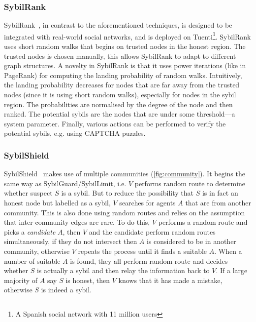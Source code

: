 
\subsubsection{SybilRank}
SybilRank~\cite{cao2012aiding}, in contrast to the aforementioned techniques, is
designed to be integrated with real-world social networks, and is deployed on
Tuenti\footnote{A Spanish social network with 11 million users}. SybilRank uses
short random walks that begins on trusted nodes in the honest region. The
trusted nodes is chosen manually, this allows SybilRank to adapt to different
graph structures. A novelty in SybilRank is that it uses power iterations (like
in PageRank) for computing the landing probability of random walks. Intuitively,
the landing probability decreases for nodes that are far away from the trusted
nodes (since it is using short random walks), especially for nodes in the sybil
region. The probabilities are normalised by the degree of the node and then
ranked. The potential sybils are the nodes that are under some threshold---a
system parameter. Finally, various actions can be performed to verify the
potential sybils, e.g. using CAPTCHA puzzles.

\subsubsection{SybilShield}
SybilShield~\cite{shi2013sybilshield} makes use of multiple communities
(\autoref{fig:community}). It begins the same way as
SybilGuard/SybilLimit, i.e. $V$ performs random route to determine whether
suspect $S$ is a sybil. But to reduce the possibility that $S$ is in fact an
honest node but labelled as a sybil, $V$ searches for agents $A$ that are from
another community. This is also done using random routes and relies on the
assumption that inter-community edges are rare. To do this, $V$ performs a
random route and picks a \emph{candidate} $A$, then $V$ and the candidate
perform random routes simultaneously, if they do not intersect then $A$ is
considered to be in another community, otherwise $V$ repeats the process until
it finds a suitable $A$. When a number of suitable $A$ is found, they all
perform random route and decides whether $S$ is actually a sybil and then relay
the information back to $V$. If a large majority of $A$ say $S$ is honest, then
$V$ knows that it has made a mistake, otherwise $S$ is indeed a sybil.

